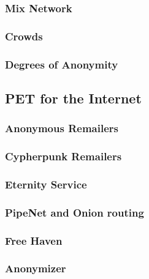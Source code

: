 \documentclass[a4paper, 10 pt, conference]{ieeeconf}
\begin{document}
\subsubsection{\textbf{Mix Network}}

\vspace{0.5cm}
\subsubsection{\textbf{Crowds}}


\vspace{0.5cm}
\subsubsection{\textbf{Degrees of Anonymity}}


\subsection{\textbf{PET for the Internet}}

\subsubsection{\textbf{Anonymous Remailers}}

\vspace{0.5cm}
\subsubsection{\textbf{Cypherpunk Remailers}}

\vspace{0.5cm}
\subsubsection{\textbf{Eternity Service}}


\vspace{0.5cm}
\subsubsection{\textbf{PipeNet and Onion routing}}

\vspace{0.5cm}
\subsubsection{\textbf{Free Haven}}

\vspace{0.5cm}
\subsubsection{\textbf{Anonymizer}}
\end{document}
